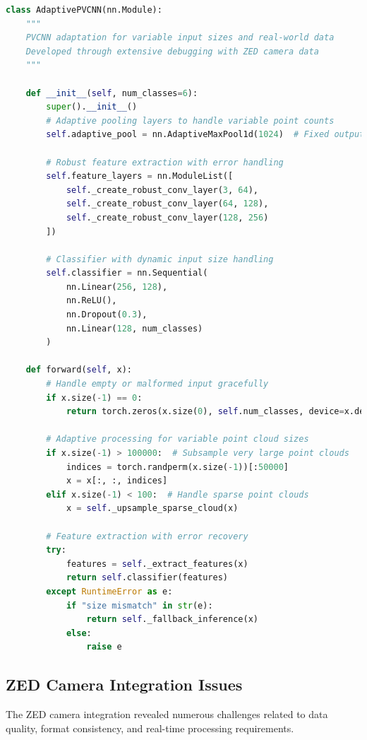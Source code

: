 \documentclass[12pt,a4paper]{report}
\begin{document}
\begin{lstlisting}[caption=PVCNN Model Adaptation for Variable Input Sizes, label=lst:pvcnn_adaptation, language=python]
class AdaptivePVCNN(nn.Module):
    """
    PVCNN adaptation for variable input sizes and real-world data
    Developed through extensive debugging with ZED camera data
    """
    
    def __init__(self, num_classes=6):
        super().__init__()
        # Adaptive pooling layers to handle variable point counts
        self.adaptive_pool = nn.AdaptiveMaxPool1d(1024)  # Fixed output size
        
        # Robust feature extraction with error handling
        self.feature_layers = nn.ModuleList([
            self._create_robust_conv_layer(3, 64),
            self._create_robust_conv_layer(64, 128),
            self._create_robust_conv_layer(128, 256)
        ])
        
        # Classifier with dynamic input size handling
        self.classifier = nn.Sequential(
            nn.Linear(256, 128),
            nn.ReLU(),
            nn.Dropout(0.3),
            nn.Linear(128, num_classes)
        )
    
    def forward(self, x):
        # Handle empty or malformed input gracefully
        if x.size(-1) == 0:
            return torch.zeros(x.size(0), self.num_classes, device=x.device)
        
        # Adaptive processing for variable point cloud sizes
        if x.size(-1) > 100000:  # Subsample very large point clouds
            indices = torch.randperm(x.size(-1))[:50000]
            x = x[:, :, indices]
        elif x.size(-1) < 100:  # Handle sparse point clouds
            x = self._upsample_sparse_cloud(x)
        
        # Feature extraction with error recovery
        try:
            features = self._extract_features(x)
            return self.classifier(features)
        except RuntimeError as e:
            if "size mismatch" in str(e):
                return self._fallback_inference(x)
            else:
                raise e
\end{lstlisting}

\subsection{ZED Camera Integration Issues}

The ZED camera integration revealed numerous challenges related to data quality, format consistency, and real-time processing requirements.
\end{document}
